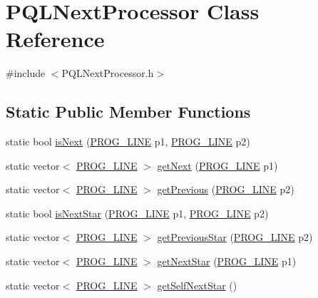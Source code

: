 \hypertarget{class_p_q_l_next_processor}{\section{P\-Q\-L\-Next\-Processor Class Reference}
\label{class_p_q_l_next_processor}
}


{\ttfamily \#include $<$P\-Q\-L\-Next\-Processor.\-h$>$}

\subsection*{Static Public Member Functions}
\begin{DoxyCompactItemize}
\item 
static bool \hyperlink{class_p_q_l_next_processor_a7504e6289a468982bf0ae3342892ec73}{is\-Next} (\hyperlink{std_afx_8h_abcc2d0120d16c2587a85b314010f6399}{P\-R\-O\-G\-\_\-\-L\-I\-N\-E} p1, \hyperlink{std_afx_8h_abcc2d0120d16c2587a85b314010f6399}{P\-R\-O\-G\-\_\-\-L\-I\-N\-E} p2)
\item 
static vector$<$ \hyperlink{std_afx_8h_abcc2d0120d16c2587a85b314010f6399}{P\-R\-O\-G\-\_\-\-L\-I\-N\-E} $>$ \hyperlink{class_p_q_l_next_processor_a2ff7fad26252a0c1d11282949ef60e8b}{get\-Next} (\hyperlink{std_afx_8h_abcc2d0120d16c2587a85b314010f6399}{P\-R\-O\-G\-\_\-\-L\-I\-N\-E} p1)
\item 
static vector$<$ \hyperlink{std_afx_8h_abcc2d0120d16c2587a85b314010f6399}{P\-R\-O\-G\-\_\-\-L\-I\-N\-E} $>$ \hyperlink{class_p_q_l_next_processor_a62fbf8a3d630cb98ddc4057c12dd61f1}{get\-Previous} (\hyperlink{std_afx_8h_abcc2d0120d16c2587a85b314010f6399}{P\-R\-O\-G\-\_\-\-L\-I\-N\-E} p2)
\item 
static bool \hyperlink{class_p_q_l_next_processor_a1c8da8e2b325162392a59b8715caf9be}{is\-Next\-Star} (\hyperlink{std_afx_8h_abcc2d0120d16c2587a85b314010f6399}{P\-R\-O\-G\-\_\-\-L\-I\-N\-E} p1, \hyperlink{std_afx_8h_abcc2d0120d16c2587a85b314010f6399}{P\-R\-O\-G\-\_\-\-L\-I\-N\-E} p2)
\item 
static vector$<$ \hyperlink{std_afx_8h_abcc2d0120d16c2587a85b314010f6399}{P\-R\-O\-G\-\_\-\-L\-I\-N\-E} $>$ \hyperlink{class_p_q_l_next_processor_a3f7f0293f38902ac84b5527f2fb06a59}{get\-Previous\-Star} (\hyperlink{std_afx_8h_abcc2d0120d16c2587a85b314010f6399}{P\-R\-O\-G\-\_\-\-L\-I\-N\-E} p2)
\item 
static vector$<$ \hyperlink{std_afx_8h_abcc2d0120d16c2587a85b314010f6399}{P\-R\-O\-G\-\_\-\-L\-I\-N\-E} $>$ \hyperlink{class_p_q_l_next_processor_a44447b6cfcbfe9b0d592a0cc77577ba2}{get\-Next\-Star} (\hyperlink{std_afx_8h_abcc2d0120d16c2587a85b314010f6399}{P\-R\-O\-G\-\_\-\-L\-I\-N\-E} p1)
\item 
static vector$<$ \hyperlink{std_afx_8h_abcc2d0120d16c2587a85b314010f6399}{P\-R\-O\-G\-\_\-\-L\-I\-N\-E} $>$ \hyperlink{class_p_q_l_next_processor_a9c10951edfc8b0ad09535b124f7b2845}{get\-Self\-Next\-Star} ()
\end{DoxyCompactItemize}


